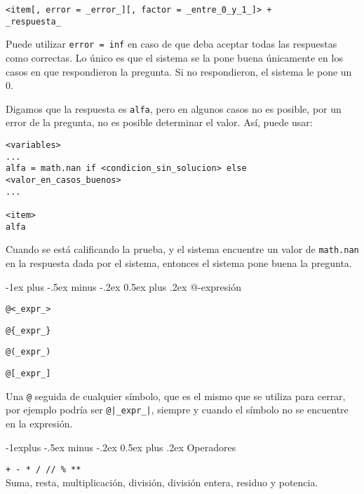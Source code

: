 \documentclass[10pt,landscape]{article}
\makeatletter
\renewcommand{\section}{\@startsection{section}{1}{0mm}%
                                {-1ex plus -.5ex minus -.2ex}%
                                {0.5ex plus .2ex}%
                                {\normalfont\large\bfseries}}
\renewcommand{\subsection}{\@startsection{subsection}{2}{0mm}%
                                {-1explus -.5ex minus -.2ex}%
                                {0.5ex plus .2ex}%
                                {\normalfont\normalsize\bfseries}}
\makeatother
\begin{document}
\begin{multicols}{3}
\begin{verbatim}
<item[, error = _error_][, factor = _entre_0_y_1_]> +
_respuesta_
\end{verbatim}

Puede utilizar \verb|error = inf| en caso de que deba aceptar todas las respuestas como correctas. Lo \'unico es que el sistema se la pone buena \'unicamente en los casos en que respondieron la pregunta. Si no respondieron, el sistema le pone un 0.

Digamos que la respuesta es \verb|alfa|, pero en algunos casos no es posible, por un error de la pregunta, no es posible determinar el valor. As\'i, puede usar:
\begin{verbatim}
<variables>
...
alfa = math.nan if <condicion_sin_solucion> else <valor_en_casos_buenos>
...

<item>
alfa
\end{verbatim}

Cuando se est\'a calificando la prueba, y el sistema encuentre un valor de \verb|math.nan| en la respuesta dada por el sistema, entonces el sistema pone buena la pregunta.


  \section{@-expresi\'on}

\begin{asparaitem}
  \item \verb|@<_expr_>|
  \item \verb|@{_expr_}|
  \item \verb|@(_expr_)|
  \item \verb|@[_expr_]|
  \item Una \verb|@| seguida de cualquier símbolo, que es el mismo que se utiliza para cerrar, por ejemplo podría ser \verb/@|_expr_|/, siempre y cuando el s\'imbolo no se encuentre en la expresi\'on. 
\end{asparaitem}

\subsection{Operadores}
\begin{asparaitem}
    \item \verb|+ - * / // % **| \\
  Suma, resta, multiplicación, división, división entera, residuo y potencia.
\end{asparaitem}


\end{multicols}
\end{document}
